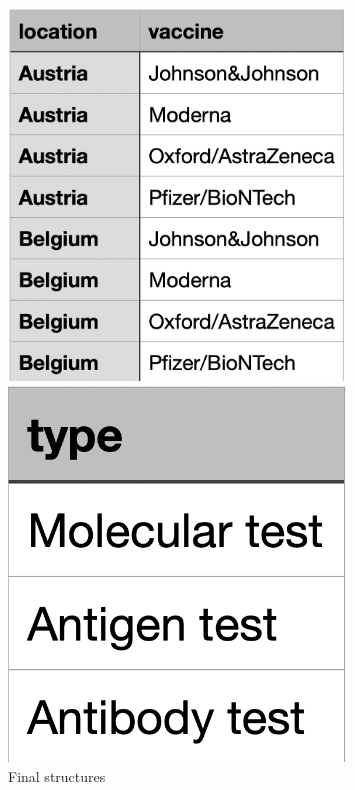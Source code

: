 \documentclass{article}[IEEEtran]
\begin{document}
 \begin{figure}[H]
    \centering
    \begin{minipage}{0.30\textwidth}
        \centering
        \includegraphics[width=0.8\textwidth,frame]{vaccines_by_country.png}
    \end{minipage}
    \begin{minipage}{0.30\textwidth}\hfill
        \centering
        \includegraphics[width=0.8\textwidth, frame]{covid_test.png} 
    \end{minipage}
    \caption{Final structures}
\end{figure}
\end{document}
